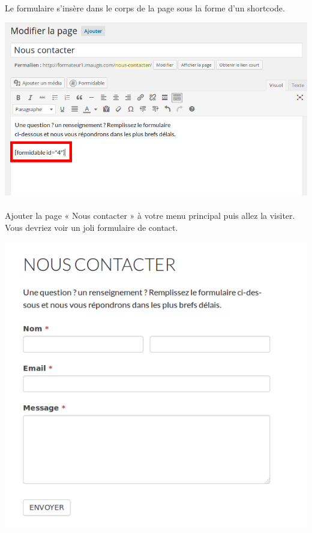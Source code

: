 \documentclass[10pt,a4paper]{article}
\begin{document}
\paragraph{}Le formulaire s'insère dans le corps de la page sous la forme d'un shortcode.
\begin{center}
\includegraphics[scale=0.3]{img/0191.png}
\end{center}
\paragraph{}Ajouter la page « Nous contacter » à votre menu principal puis allez la visiter. Vous devriez voir un joli formulaire de contact.
\begin{center}
\includegraphics[scale=0.3]{img/0192.png}
\end{center}
\newpage
\end{document}
